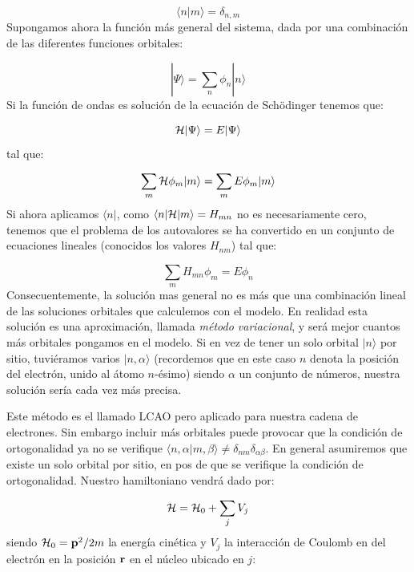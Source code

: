 \begin{equation}
	\langle n | m \rangle = \delta_{n,m}
\end{equation}
Supongamos ahora la función más general del sistema, dada por una combinación de las diferentes funciones orbitales:

\begin{equation}
	|\Psi \rangle = \sum_n \phi_n |n\rangle
\end{equation}
Si la función de ondas es solución de la ecuación de Schödinger tenemos que:

\begin{equation}
	\mathcal{H} |\Psi \rangle = E |\Psi \rangle 
\end{equation}
tal que:

\begin{equation}
	\sum_m \mathcal{H} \phi_m |m\rangle =  \sum_m E \phi_m |m\rangle
\end{equation}
Si ahora aplicamos $\langle n |$, como $\langle n| \mathcal{H} | m \rangle= H_{mn}$ no es necesariamente cero, tenemos que el problema de los autovalores se ha convertido en un conjunto de ecuaciones lineales (conocidos los valores $H_{nm}$) tal que:


\begin{equation}
	\sum_m H_{mn} \phi_m  =  E \phi_n \label{Ec:07-01-04}
\end{equation}
Consecuentemente, la solución mas general no es más que una combinación lineal de las soluciones orbitales que calculemos con el modelo. En realidad esta solución es una aproximación, llamada \textit{método variacional}, y será mejor cuantos más orbitales pongamos en el modelo. Si en vez de tener un solo orbital $|n\rangle$ por sitio, tuviéramos varios $|n,\alpha\rangle$ (recordemos que en este caso $n$ denota la posición del electrón, unido al átomo $n$-ésimo) siendo $\alpha$ un conjunto de números, nuestra solución sería cada vez más precisa.

Este método es el llamado LCAO pero aplicado para nuestra cadena de electrones. Sin embargo incluir más orbitales puede provocar que la condición de ortogonalidad ya no se verifique $\langle n ,\alpha | m,\beta \rangle \neq \delta_{nm} \delta_{\alpha \beta}$. En general asumiremos que existe un solo orbital por sitio, en pos de que se verifique la condición de ortogonalidad. Nuestro hamiltoniano vendrá dado por:

\begin{equation}
	\mathcal{H} = \mathcal{H}_0 + \sum_{j} V_j
\end{equation}
siendo $\mathcal{H}_0 = \mathbf{p}^2 /2m$ la energía cinética y $V_j$ la interacción de Coulomb en del electrón en la posición $\mathbf{r}$ en el núcleo ubicado en $j$:

